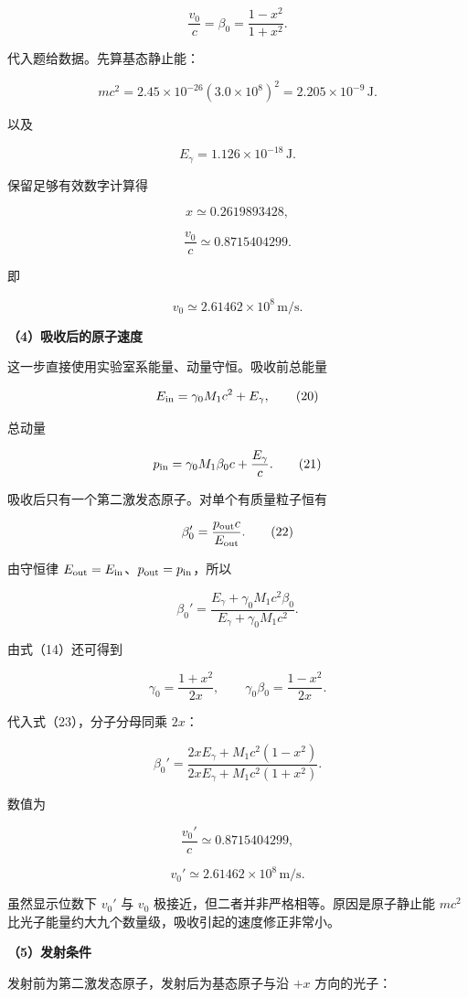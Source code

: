 \documentclass[12pt,a4paper,UTF8]{ctexart}
\begin{document}
\[
\boxed{
\frac{v_0}{c}=\beta_0=\frac{1-x^2}{1+x^2}
}.
\tag{15}
\]

代入题给数据。先算基态静止能：

\[
mc^2
=2.45\times10^{-26}(3.0\times10^8)^2
=2.205\times10^{-9}\,\mathrm J.
\tag{16}
\]

以及

\[
E_\gamma=1.126\times10^{-18}\,\mathrm J.
\tag{17}
\]

保留足够有效数字计算得

\[
x\simeq0.2619893428,
\]

\[
\boxed{
\frac{v_0}{c}\simeq0.8715404299
}.
\tag{18}
\]

即

\[
\boxed{
v_0\simeq2.61462\times10^8\,\mathrm{m/s}
}.
\tag{19}
\]

\textbf{（4）吸收后的原子速度}

这一步直接使用实验室系能量、动量守恒。吸收前总能量

\[
E_{\rm in}=\gamma_0M_1c^2+E_\gamma,
\tag{20}
\]

总动量

\[
p_{\rm in}=\gamma_0M_1\beta_0c+\frac{E_\gamma}{c}.
\tag{21}
\]

吸收后只有一个第二激发态原子。对单个有质量粒子恒有

\[
\beta_0'=\frac{p_{\rm out}c}{E_{\rm out}}.
\tag{22}
\]

由守恒律 \(E_{\rm out}=E_{\rm in}\)、\(p_{\rm out}=p_{\rm in}\)，所以

\[
\boxed{
\beta_0'
=\frac{E_\gamma+\gamma_0M_1c^2\beta_0}
{E_\gamma+\gamma_0M_1c^2}
}.
\tag{23}
\]

由式（14）还可得到

\[
\gamma_0=\frac{1+x^2}{2x},
\qquad
\gamma_0\beta_0=\frac{1-x^2}{2x}.
\tag{24}
\]

代入式（23），分子分母同乘 \(2x\)：

\[
\boxed{
\beta_0'
=\frac{2xE_\gamma+M_1c^2(1-x^2)}
{2xE_\gamma+M_1c^2(1+x^2)}
}.
\tag{25}
\]

数值为

\[
\boxed{
\frac{v_0'}c\simeq0.8715404299
},
\tag{26}
\]

\[
\boxed{
v_0'\simeq2.61462\times10^8\,\mathrm{m/s}
}.
\tag{27}
\]

虽然显示位数下 \(v_0'\) 与 \(v_0\)
极接近，但二者并非严格相等。原因是原子静止能 \(mc^2\)
比光子能量约大九个数量级，吸收引起的速度修正非常小。

\textbf{（5）发射条件}

发射前为第二激发态原子，发射后为基态原子与沿 \(+x\) 方向的光子：
\end{document}
